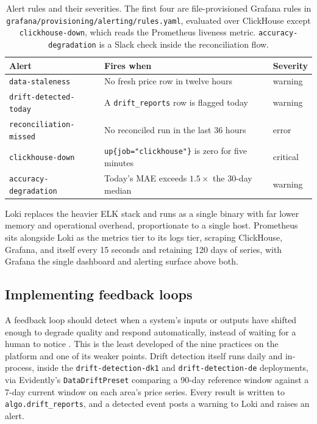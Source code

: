 \begin{table}[H]
  \centering
  \small
  \renewcommand{\arraystretch}{1.3}
  \setlength{\tabcolsep}{6pt}
  \caption{Alert rules and their severities. The first four are file-provisioned Grafana rules in \texttt{grafana/provisioning/alerting/rules.yaml}, evaluated over ClickHouse except \texttt{clickhouse-down}, which reads the Prometheus liveness metric. \texttt{accuracy-degradation} is a Slack check inside the reconciliation flow.}
  \label{tab:alert-rules}
  \begin{tabularx}{\linewidth}{@{}l >{\raggedright\arraybackslash}X l@{}}
    \toprule
    \textbf{Alert} & \textbf{Fires when} & \textbf{Severity} \\
    \midrule
    \texttt{data-staleness}        & No fresh price row in twelve hours                      & warning  \\
    \texttt{drift-detected-today}  & A \texttt{drift\_reports} row is flagged today          & warning  \\
    \texttt{reconciliation-missed} & No reconciled run in the last 36 hours                  & error    \\
    \texttt{clickhouse-down}       & \texttt{up\{job="clickhouse"\}} is zero for five minutes & critical \\
    \texttt{accuracy-degradation}  & Today's MAE exceeds $1.5\times$ the 30-day median       & warning  \\
    \bottomrule
  \end{tabularx}
\end{table}

Loki replaces the heavier ELK stack and runs as a single binary with far lower
memory and operational overhead, proportionate to a single host. Prometheus sits alongside
Loki as the metrics
tier to its logs tier, scraping ClickHouse, Grafana, and itself every 15 seconds
and retaining 120 days of series, with Grafana the single dashboard and alerting
surface above both.

\subsection{Implementing feedback loops}

A feedback loop should detect when a system's inputs or outputs have shifted
enough to degrade quality and respond automatically, instead of waiting for a
human to notice \cite{zarour2025}. This is the least developed of
the nine practices on the platform and one of its weaker points. Drift detection
itself runs daily and in-process, inside the \texttt{drift-detection-dk1} and
\texttt{drift-detection-de} deployments, via Evidently's \texttt{DataDriftPreset}
comparing a 90-day reference window against a 7-day current window on each area's
price series. Every result is written to \texttt{algo.drift\_reports}, and a
detected event posts a warning to Loki and raises an alert.

